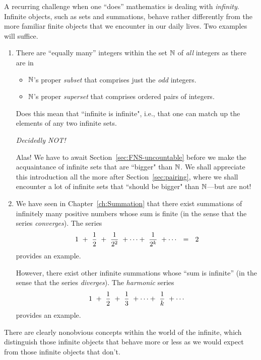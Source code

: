 A recurring challenge when one ``does'' mathematics is dealing with {\em infinity}.  Infinite objects, such as sets and summations, behave rather differently from the more familiar finite objects that we encounter in our daily lives.  Two examples will suffice.  
\begin{enumerate}
\item
There are ``equally many'' integers within the set $\mathbb{N}$ of {\em all} integers as there are in
  \begin{itemize}
  \item
$\mathbb{N}$'s proper {\em subset} that comprises just the {\em odd} integers.
  \medskip\item
$\mathbb{N}$'s proper {\em superset} that comprises ordered pairs of integers.
  \end{itemize}
Does this mean that ``infinite is infinite", i.e., that one can match up the elements of any two infinite sets.
  
\smallskip

\noindent
{\em Decidedly NOT!}

\smallskip


\noindent
Alas!  We have to await Section~\ref{sec:FNS-uncountable} before we make the acquaintance of infinite sets that are ``bigger" than $\mathbb{N}$.  We shall appreciate this introduction all the more after Section~\ref{sec:pairing}, where we shall encounter a lot of infinite sets that ``should be bigger" than $\mathbb{N}$---but are not! 


\medskip\item
We have seen in Chapter~\ref{ch:Summation} that there exist summations of infinitely many positive numbers whose sum is finite (in the sense that the series {\em converges}).  The series
\[ 1 \ + \ {1 \over 2} \ + \ {1 \over 2^2} \ + \cdots + \ {1 \over 2^k} \ + \cdots \ \ = \ \ 2 \]
provides an example.

\smallskip

However, there exist other infinite summations whose ``sum is infinite'' (in the sense that the series {\em diverges}).  The {\it harmonic} series
\[ 1 \ + \ {1 \over 2} \ + \ {1 \over 3} \ + \cdots + \ {1 \over k} \ + \cdots \]
provides an example.
\end{enumerate}
There are clearly nonobvious concepts within the world of the infinite, which distinguish those infinite objects that behave more or less as we would expect from those infinite objects that don't.

